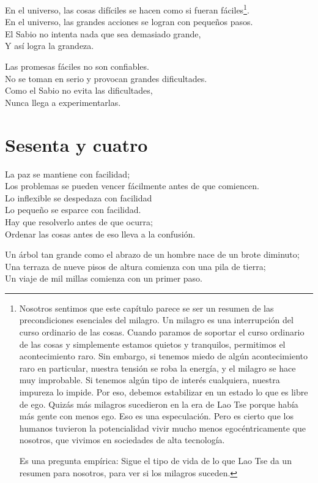 \documentclass[book,b5paper,hidelinks,final]{memoir}
\begin{document}
	En el universo, las cosas difíciles se hacen como si fueran fáciles\footnote{Nosotros sentimos que este capítulo parece se ser un resumen de las
		precondiciones esenciales del milagro. Un milagro es una interrupción
		del curso ordinario de las cosas. Cuando paramos de soportar el curso
		ordinario de las cosas y simplemente estamos quietos y tranquilos,
		permitimos el acontecimiento raro. Sin embargo, si tenemos miedo de
		algún acontecimiento raro en particular, nuestra tensión se roba la
		energía, y el milagro se hace muy improbable. Si tenemos algún tipo de
		interés cualquiera, nuestra impureza lo impide. Por eso, debemos
		estabilizar en un estado lo que es libre de ego. Quizás más milagros
		sucedieron en la era de Lao Tse porque había más gente con menos ego.
		Eso es una especulación. Pero es cierto que los humanos tuvieron la
		potencialidad vivir mucho menos egocéntricamente que nosotros, que
		vivimos en sociedades de alta tecnología.

Es una pregunta empírica: Sigue el tipo de vida de lo que Lao Tse da un
resumen para nosotros, para ver si los milagros suceden.	
}.\\
	En el universo, las grandes acciones se logran con pequeños pasos.\\
	El Sabio no intenta nada que sea demasiado grande,\\
	Y así logra la grandeza.
	
	Las promesas fáciles no son confiables.\\
	No se toman en serio y provocan grandes dificultades.\\
	Como el Sabio no evita las dificultades,\\
	Nunca llega a experimentarlas.
	
	\chapter*{Sesenta y cuatro}
	
	La paz se mantiene con facilidad;\\
	Los problemas se pueden vencer fácilmente antes de que comiencen.\\
	Lo inflexible se despedaza con facilidad\\
	Lo pequeño se esparce con facilidad.\\
	Hay que resolverlo antes de que ocurra;\\
	Ordenar las cosas antes de eso lleva a la confusión.
	
	Un árbol tan grande como el abrazo de un hombre nace de un brote
	diminuto;\\
	Una terraza de nueve pisos de altura comienza con una pila de tierra;\\
	Un viaje de mil millas comienza con un primer paso.
	
\end{document}
